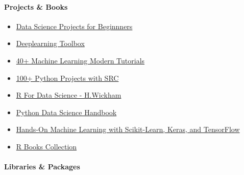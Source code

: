 \documentclass[
]{article}
\providecommand{\tightlist}{%
  \setlength{\itemsep}{0pt}\setlength{\parskip}{0pt}}
\begin{document}
\hypertarget{projects-books}{%
\paragraph{Projects \& Books}\label{projects-books}}

\begin{itemize}
\tightlist
\item
  \href{https://data-flair.training/blogs/data-science-projects-code/}{Data
  Science Projects for Beginnners}
\item
  \href{https://www.mathworks.com/help/deeplearning/examples.html?s_tid=ans_recom_nba-get}{Deeplearning
  Toolbox}
\item
  \href{https://www.datasciencecentral.com/40-tutorials-covering-all-aspects-of-machine-learning/}{40+
  Machine Learning Modern Tutorials}
\item
  \href{https://thecleverprogrammer.com/2021/01/14/python-projects-with-source-code/}{100+
  Python Projects with SRC}
\item
  \href{https://r4ds.had.co.nz}{R For Data Science - H.Wickham}
\item
  \href{https://www.oreilly.com/library/view/python-data-science/9781491912126/}{Python
  Data Science Handbook}
\item
  \href{https://www.oreilly.com/library/view/hands-on-machine-learning/9781492032632/}{Hands-On
  Machine Learning with Scikit-Learn, Keras, and TensorFlow}
\item
  \href{https://www.rstudio.com/resources/books/}{R Books Collection}
\end{itemize}

\hypertarget{libraries-packages}{%
\paragraph{Libraries \& Packages}\label{libraries-packages}}
\end{document}
